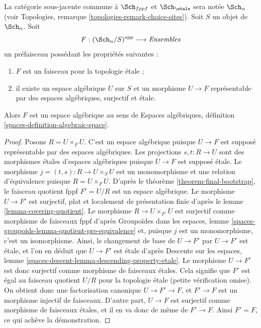 \begin{lemma}
\label{lemma-spaces-etale-locally-representable}
La catégorie sous-jacente commune à $\Sch_{fppf}$ et $\Sch_\etale$ sera notée
$\Sch_\alpha$
(voir Topologies, remarque \ref{topologies-remark-choice-sites}).
Soit $S$ un objet de $\Sch_\alpha$. Soit
$$
F : (\Sch_\alpha/S)^{opp} \longrightarrow \textit{Ensembles}
$$
un préfaisceau possédant les propriétés suivantes :
\begin{enumerate}
\item $F$ est un faisceau pour la topologie étale ;
\item il existe un espace algébrique $U$ sur $S$
et un morphisme $U \to F$ représentable par
des espaces algébriques, surjectif et étale.
\end{enumerate}
Alors $F$ est un espace algébrique au sens de
Espaces algébriques, définition \ref{spaces-definition-algebraic-space}.
\end{lemma}

\begin{proof}
Posons $R = U \times_F U$. C'est un espace algébrique puisque $U \to F$ est supposé
représentable par des espaces algébriques. Les projections $s, t : R \to U$ sont des
morphismes étales d'espaces algébriques puisque $U \to F$ est supposé étale.
Le morphisme $j = (t, s) : R \to U \times_S U$ est un monomorphisme et une
relation d'équivalence puisque $R = U \times_F U$. D'après le
théorème \ref{theorem-final-bootstrap},
le faisceau quotient fppf $F' = U/R$ est un espace algébrique.
Le morphisme $U \to F'$ est surjectif, plat et localement de présentation
finie d'après le lemme \ref{lemma-covering-quotient}.
Le morphisme $R \to U \times_{F'} U$ est surjectif comme morphisme de faisceaux
fppf d'après Groupoïdes dans les espaces, lemme
\ref{spaces-groupoids-lemma-quotient-pre-equivalence}
et, puisque $j$ est un monomorphisme, c'est un isomorphisme.
Ainsi, le changement de base de $U \to F'$ par $U \to F'$ est étale,
et l'on en déduit que $U \to F'$ est étale d'après
Descente sur les espaces, lemme \ref{spaces-descent-lemma-descending-property-etale}.
Le morphisme $U \to F'$ est donc surjectif comme morphisme de faisceaux étales.
Cela signifie que $F'$ est égal au faisceau quotient $U/R$
pour la topologie étale (petite vérification omise). On obtient donc
une factorisation canonique $U \to F' \to F$, et $F' \to F$ est un morphisme
injectif de faisceaux. D'autre part, $U \to F$ est surjectif comme morphisme
de faisceaux étales, et il en va donc de même de $F' \to F$. Ainsi $F' = F$,
ce qui achève la démonstration.
\end{proof}

